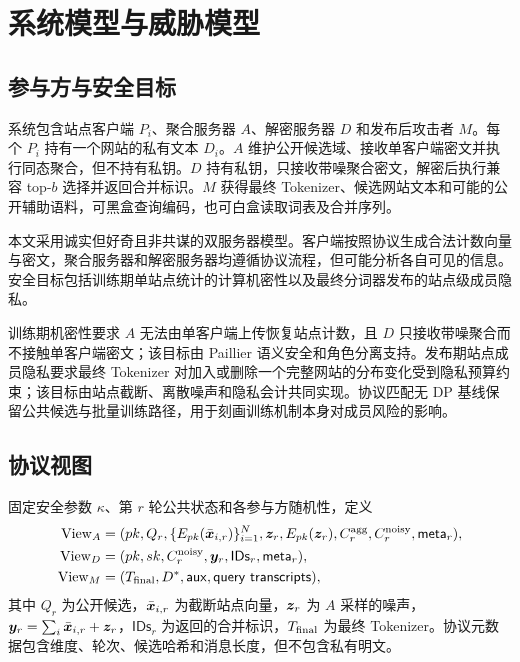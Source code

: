 \section{系统模型与威胁模型}

\subsection{参与方与安全目标}

系统包含站点客户端 $P_i$、聚合服务器 $A$、解密服务器 $D$ 和发布后攻击者 $M$。每个 $P_i$ 持有一个网站的私有文本 $D_i$。$A$ 维护公开候选域、接收单客户端密文并执行同态聚合，但不持有私钥。$D$ 持有私钥，只接收带噪聚合密文，解密后执行兼容 top-$b$ 选择并返回合并标识。$M$ 获得最终 Tokenizer、候选网站文本和可能的公开辅助语料，可黑盒查询编码，也可白盒读取词表及合并序列。

本文采用诚实但好奇且非共谋的双服务器模型。客户端按照协议生成合法计数向量与密文，聚合服务器和解密服务器均遵循协议流程，但可能分析各自可见的信息。安全目标包括训练期单站点统计的计算机密性以及最终分词器发布的站点级成员隐私。

训练期机密性要求 $A$ 无法由单客户端上传恢复站点计数，且 $D$ 只接收带噪聚合而不接触单客户端密文；该目标由 Paillier 语义安全和角色分离支持。发布期站点成员隐私要求最终 Tokenizer 对加入或删除一个完整网站的分布变化受到隐私预算约束；该目标由站点截断、离散噪声和隐私会计共同实现。协议匹配无 DP 基线保留公共候选与批量训练路径，用于刻画训练机制本身对成员风险的影响。

\subsection{协议视图}

\begin{definition}[协议视图]
固定安全参数 $\kappa$、第 $r$ 轮公共状态和各参与方随机性，定义
\begin{align*}
\mathrm{View}_A={}&(pk,Q_r,\{E_{pk}(\bar{\vect x}_{i,r})\}_{i=1}^{N},\vect z_r,
E_{pk}(\vect z_r),C^{\rm agg}_r,C^{\rm noisy}_r,\mathsf{meta}_r),\\
\mathrm{View}_D={}&(pk,sk,C^{\rm noisy}_r,\vect y_r,\mathsf{IDs}_r,\mathsf{meta}_r),\\
\mathrm{View}_M={}&(T_{\rm final},D^*,\mathsf{aux},\mathsf{query\ transcripts}),
\end{align*}
其中 $Q_r$ 为公开候选，$\bar{\bm{x}}_{i,r}$ 为截断站点向量，$\bm{z}_r$ 为 $A$ 采样的噪声，$\bm{y}_r=\sum_i\bar{\bm{x}}_{i,r}+\bm{z}_r$，$\mathsf{IDs}_r$ 为返回的合并标识，$T_{\rm final}$ 为最终 Tokenizer。协议元数据包含维度、轮次、候选哈希和消息长度，但不包含私有明文。
\end{definition}

